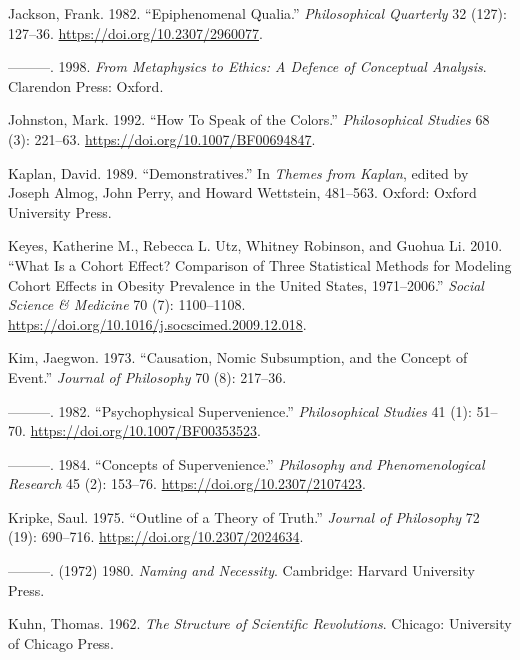 \documentclass[
  12pt,
  letterpaper,
  DIV=11,
  numbers=noendperiod]{scrartcl}
\newlength{\cslhangindent}
\newenvironment{CSLReferences}[2] %
 {\begin{list}{}{%
  \setlength{\itemindent}{0pt}
  \setlength{\leftmargin}{0pt}
  \setlength{\parsep}{0pt}
  \ifodd #1
   \setlength{\leftmargin}{\cslhangindent}
   \setlength{\itemindent}{-1\cslhangindent}
  \fi
  \setlength{\itemsep}{#2\baselineskip}}}
 {\end{list}}
\begin{document}
\begin{CSLReferences}{1}{0}
Jackson, Frank. 1982. {``Epiphenomenal Qualia.''} \emph{Philosophical
Quarterly} 32 (127): 127--36. \url{https://doi.org/10.2307/2960077}.

---------. 1998. \emph{From Metaphysics to Ethics: A Defence of
Conceptual Analysis}. Clarendon Press: Oxford.

Johnston, Mark. 1992. {``How To Speak of the Colors.''}
\emph{Philosophical Studies} 68 (3): 221--63.
\url{https://doi.org/10.1007/BF00694847}.

Kaplan, David. 1989. {``Demonstratives.''} In \emph{Themes from Kaplan},
edited by Joseph Almog, John Perry, and Howard Wettstein, 481--563.
Oxford: Oxford University Press.

Keyes, Katherine M., Rebecca L. Utz, Whitney Robinson, and Guohua Li.
2010. {``What Is a Cohort Effect? Comparison of Three Statistical
Methods for Modeling Cohort Effects in Obesity Prevalence in the United
States, 1971--2006.''} \emph{Social Science \& Medicine} 70 (7):
1100--1108. \url{https://doi.org/10.1016/j.socscimed.2009.12.018}.

Kim, Jaegwon. 1973. {``Causation, Nomic Subsumption, and the Concept of
Event.''} \emph{Journal of Philosophy} 70 (8): 217--36.

---------. 1982. {``Psychophysical Supervenience.''} \emph{Philosophical
Studies} 41 (1): 51--70. \url{https://doi.org/10.1007/BF00353523}.

---------. 1984. {``Concepts of Supervenience.''} \emph{Philosophy and
Phenomenological Research} 45 (2): 153--76.
\url{https://doi.org/10.2307/2107423}.

Kripke, Saul. 1975. {``Outline of a Theory of Truth.''} \emph{Journal of
Philosophy} 72 (19): 690--716. \url{https://doi.org/10.2307/2024634}.

---------. (1972) 1980. \emph{Naming and Necessity}. Cambridge: Harvard
University Press.

Kuhn, Thomas. 1962. \emph{The Structure of Scientific Revolutions}.
Chicago: University of Chicago Press.


\end{CSLReferences}
\end{document}
